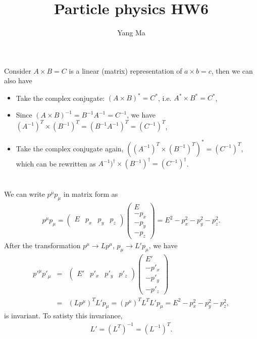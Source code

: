 \documentclass[11pt]{article}
\begin{document}
\title{Particle physics HW6}
\author{Yang Ma}

\maketitle

\section{ }
Consider $A \times B = C$ is a linear (matrix) representation of $a\times b = c$, then we can also have
\begin{itemize}
    \item Take the complex conjugate: $(A \times B)^* = C^*$, i.e. $A^* \times B^* = C^*$,
    \item Since $(A \times B)^{-1} =B^{-1} A^{-1} = C^{-1}$, we have $(A^{-1})^T \times (B^{-1})^T = (B^{-1} A^{-1})^T = (C^{-1})^T$,
    \item Take the complex conjugate again, $((A^{-1})^T \times (B^{-1})^T)^* = (C^{-1})^T$, which can be rewritten as $A^{-1})^\dagger \times (B^{-1})^\dagger = (C^{-1})^\dagger$.
\end{itemize}

\section{ }
We can write $p^\mu p_\mu$ in matrix form as
\begin{eqnarray}
    p^\mu p_\mu =
    \begin{pmatrix}
        E&p_x&p_y&p_z
    \end{pmatrix}
    \begin{pmatrix}
        E \\ -p_x \\-p_y\\-p_z
    \end{pmatrix}
    = E^2- p_x^2-p_y^2-p_z^2.
\end{eqnarray}
After the transformation $p^\mu \to L p^\mu$, $p_\mu \to L' p_\mu$, we have
\begin{eqnarray}
    {p'}^\mu p'_\mu &=&
    \begin{pmatrix}
        E'&p'_x&p'_y&p'_z
    \end{pmatrix}
    \begin{pmatrix}
        E' \\ -p'_x \\-p'_y\\-p'_z
    \end{pmatrix} \nonumber \\
    &=&
    (L p^\mu)^T L' p_\mu = (p^\mu)^T L^T L' p_\mu
    = E^2- p_x^2-p_y^2-p_z^2,
\end{eqnarray}
is invariant. To satisty this invariance,
\begin{eqnarray}
    L'=(L^T)^{-1}=(L^{-1})^T.
\end{eqnarray}
\end{document}
